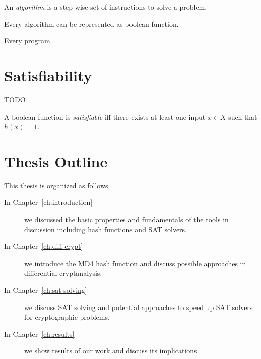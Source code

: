 \begin{defi}
  An \emph{algorithm} is a step-wise set of instructions to solve a problem.
\end{defi}

\begin{theorem}
  Every algorithm can be represented as boolean function.
\end{theorem}

Every program



\section{Satisfiability}
\label{ch:sat}
%
TODO

\begin{defi}
  A boolean function is \emph{satisfiable} iff there exists at least one
  input $x \in X$ such that $h(x) = 1$.
\end{defi}



\section{Thesis Outline}
%
This thesis is organized as follows.

\begin{description}
\item[In Chapter~\ref{ch:introduction}] we discussed the basic properties and fundamentals
of the tools in discussion including hash functions and SAT solvers.

\item[In Chapter~\ref{ch:diff-crypt}] we introduce the MD4 hash function and
discuss possible approaches in differential cryptanalysis.

\item[In Chapter~\ref{ch:sat-solving}] we discuss SAT solving and potential
approaches to speed up SAT solvers for cryptographic problems.

\item[In Chapter~\ref{ch:results}] we show results of our work
and discuss its implications.
\end{description}

